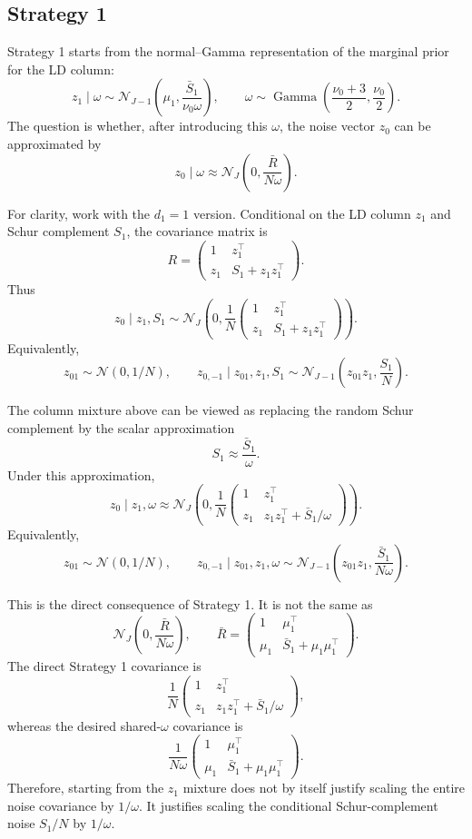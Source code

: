 \documentclass[11pt]{article}
\newcommand{\Rbar}{\bar R}
\newcommand{\Normal}{\mathcal N}
\newcommand{\Gam}{\operatorname{Gamma}}
\begin{document}
\subsection{Strategy 1}

Strategy 1 starts from the normal--Gamma representation of the marginal prior
for the LD column:
\[
z_1\mid \omega
\sim
\Normal_{J-1}\left(
\mu_1,\frac{\bar S_1}{\nu_0\omega}
\right),
\qquad
\omega\sim
\Gam\left(\frac{\nu_0+3}{2},\frac{\nu_0}{2}\right).
\]
The question is whether, after introducing this \(\omega\), the noise vector
\(z_0\) can be approximated by
\[
z_0\mid \omega
\approx
\Normal_J\left(0,\frac{\Rbar}{N\omega}\right).
\]

For clarity, work with the \(d_1=1\) version. Conditional on the LD column
\(z_1\) and Schur complement \(S_1\), the covariance matrix is
\[
R=
\begin{pmatrix}
1 & z_1^\top\\
z_1 & S_1+z_1z_1^\top
\end{pmatrix}.
\]
Thus
\[
z_0\mid z_1,S_1
\sim
\Normal_J\left(
0,
\frac1N
\begin{pmatrix}
1 & z_1^\top\\
z_1 & S_1+z_1z_1^\top
\end{pmatrix}
\right).
\]
Equivalently,
\[
z_{01}\sim\Normal(0,1/N),
\qquad
z_{0,-1}\mid z_{01},z_1,S_1
\sim
\Normal_{J-1}\left(z_{01}z_1,\frac{S_1}{N}\right).
\]

The column mixture above can be viewed as replacing the random Schur complement
by the scalar approximation
\[
S_1\approx \frac{\bar S_1}{\omega}.
\]
Under this approximation,
\[
z_0\mid z_1,\omega
\approx
\Normal_J\left(
0,
\frac1N
\begin{pmatrix}
1 & z_1^\top\\
z_1 & z_1z_1^\top+\bar S_1/\omega
\end{pmatrix}
\right).
\]
Equivalently,
\[
z_{01}\sim\Normal(0,1/N),
\qquad
z_{0,-1}\mid z_{01},z_1,\omega
\sim
\Normal_{J-1}\left(
z_{01}z_1,\frac{\bar S_1}{N\omega}
\right).
\]

This is the direct consequence of Strategy 1. It is not the same as
\[
\Normal_J\left(0,\frac{\Rbar}{N\omega}\right),
\qquad
\Rbar=
\begin{pmatrix}
1 & \mu_1^\top\\
\mu_1 & \bar S_1+\mu_1\mu_1^\top
\end{pmatrix}.
\]
The direct Strategy 1 covariance is
\[
\frac1N
\begin{pmatrix}
1 & z_1^\top\\
z_1 & z_1z_1^\top+\bar S_1/\omega
\end{pmatrix},
\]
whereas the desired shared-\(\omega\) covariance is
\[
\frac1{N\omega}
\begin{pmatrix}
1 & \mu_1^\top\\
\mu_1 & \bar S_1+\mu_1\mu_1^\top
\end{pmatrix}.
\]
Therefore, starting from the \(z_1\) mixture does not by itself justify scaling
the entire noise covariance by \(1/\omega\). It justifies scaling the
conditional Schur-complement noise \(S_1/N\) by \(1/\omega\).
\end{document}
